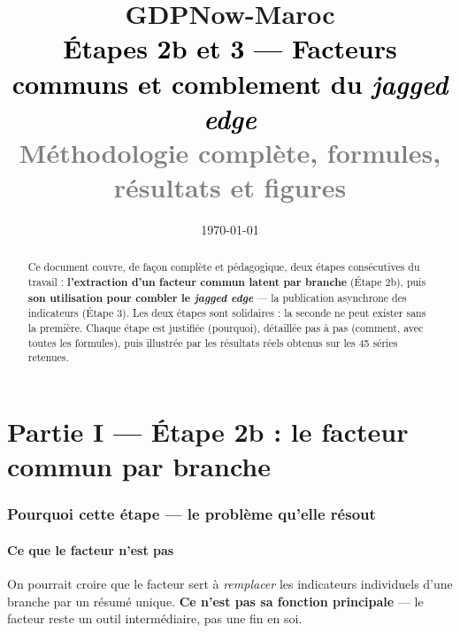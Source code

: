 \documentclass[11pt,a4paper]{article}
\title{\vspace{-1.3cm}\textcolor{bleuprincip}{\Huge\bfseries GDPNow-Maroc}\\[0.3cm]
\textcolor{black}{\Large Étapes 2b et 3 --- Facteurs communs et comblement du \emph{jagged edge}}\\[0.15cm]
\textcolor{gray}{\large Méthodologie complète, formules, résultats et figures}}
\author{}
\date{\today}
\begin{document}
\maketitle
\thispagestyle{empty}

\begin{abstract}
\noindent Ce document couvre, de façon complète et pédagogique, deux étapes consécutives du travail : \textbf{l'extraction d'un facteur commun latent par branche} (Étape 2b), puis \textbf{son utilisation pour combler le \emph{jagged edge}} --- la publication asynchrone des indicateurs (Étape 3). Les deux étapes sont solidaires : la seconde ne peut exister sans la première. Chaque étape est justifiée (pourquoi), détaillée pas à pas (comment, avec toutes les formules), puis illustrée par les résultats réels obtenus sur les 45 séries retenues.
\end{abstract}

\tableofcontents
\vspace{0.5cm}

\part*{Partie I --- Étape 2b : le facteur commun par branche}

\section{Pourquoi cette étape --- le problème qu'elle résout}

\subsection{Ce que le facteur n'est pas}

\begin{intuition}
On pourrait croire que le facteur sert à \emph{remplacer} les indicateurs individuels d'une branche par un résumé unique. \textbf{Ce n'est pas sa fonction principale} --- le facteur reste un outil intermédiaire, pas une fin en soi.
\end{intuition}
\end{document}
